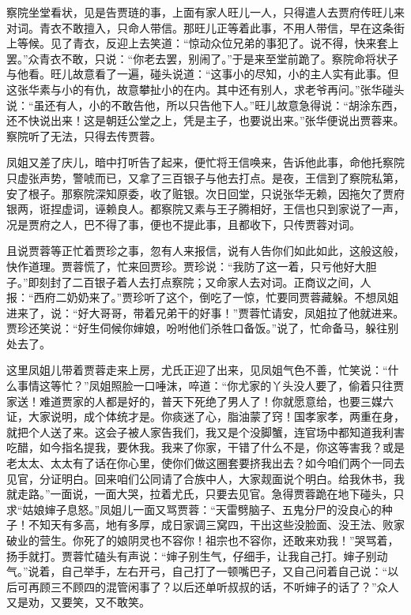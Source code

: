 \documentclass[12pt,oneside]{book}
\begin{document}
察院坐堂看状，见是告贾琏的事，上面有家人旺儿一人，只得遣人去贾府传旺儿来对词。青衣不敢擅入，只命人带信。那旺儿正等着此事，不用人带信，早在这条街上等候。见了青衣，反迎上去笑道：“惊动众位兄弟的事犯了。说不得，快来套上罢。”众青衣不敢，只说：“你老去罢，别闹了。”于是来至堂前跪了。察院命将状子与他看。旺儿故意看了一遍，碰头说道：“这事小的尽知，小的主人实有此事。但这张华素与小的有仇，故意攀扯小的在内。其中还有别人，求老爷再问。”张华碰头说：“虽还有人，小的不敢告他，所以只告他下人。”旺儿故意急得说：“胡涂东西，还不快说出来！这是朝廷公堂之上，凭是主子，也要说出来。”张华便说出贾蓉来。察院听了无法，只得去传贾蓉。

凤姐又差了庆儿，暗中打听告了起来，便忙将王信唤来，告诉他此事，命他托察院只虚张声势，警唬而已，又拿了三百银子与他去打点。是夜，王信到了察院私第，安了根子。那察院深知原委，收了赃银。次日回堂，只说张华无赖，因拖欠了贾府银两，诳捏虚词，诬赖良人。都察院又素与王子腾相好，王信也只到家说了一声，况是贾府之人，巴不得了事，便也不提此事，且都收下，只传贾蓉对词。

且说贾蓉等正忙着贾珍之事，忽有人来报信，说有人告你们如此如此，这般这般，快作道理。贾蓉慌了，忙来回贾珍。贾珍说：“我防了这一着，只亏他好大胆子。”即刻封了二百银子着人去打点察院；又命家人去对词。正商议之间，人报：“西府二奶奶来了。”贾珍听了这个，倒吃了一惊，忙要同贾蓉藏躲。不想凤姐进来了，说：“好大哥哥，带着兄弟干的好事！”贾蓉忙请安，凤姐拉了他就进来。贾珍还笑说：“好生伺候你婶娘，吩咐他们杀牲口备饭。”说了，忙命备马，躲往别处去了。

这里凤姐儿带着贾蓉走来上房，尤氏正迎了出来，见凤姐气色不善，忙笑说：“什么事情这等忙？”凤姐照脸一口唾沫，啐道：“你尤家的丫头没人要了，偷着只往贾家送！难道贾家的人都是好的，普天下死绝了男人了！你就愿意给，也要三媒六证，大家说明，成个体统才是。你痰迷了心，脂油蒙了窍！国孝家孝，两重在身，就把个人送了来。这会子被人家告我们，我又是个没脚蟹，连官场中都知道我利害吃醋，如今指名提我，要休我。我来了你家，干错了什么不是，你这等害我？或是老太太、太太有了话在你心里，使你们做这圈套要挤我出去？如今咱们两个一同去见官，分证明白。回来咱们公同请了合族中人，大家觌面说个明白。给我休书，我就走路。”一面说，一面大哭，拉着尤氏，只要去见官。急得贾蓉跪在地下碰头，只求“姑娘婶子息怒。”凤姐儿一面又骂贾蓉：“天雷劈脑子、五鬼分尸的没良心的种子！不知天有多高，地有多厚，成日家调三窝四，干出这些没脸面、没王法、败家破业的营生。你死了的娘阴灵也不容你！祖宗也不容你，还敢来劝我！”哭骂着，扬手就打。贾蓉忙磕头有声说：“婶子别生气，仔细手，让我自己打。婶子别动气。”说着，自己举手，左右开弓，自己打了一顿嘴巴子，又自己问着自己说：“以后可再顾三不顾四的混管闲事了？以后还单听叔叔的话，不听婶子的话了？”众人又是劝，又要笑，又不敢笑。
\end{document}
